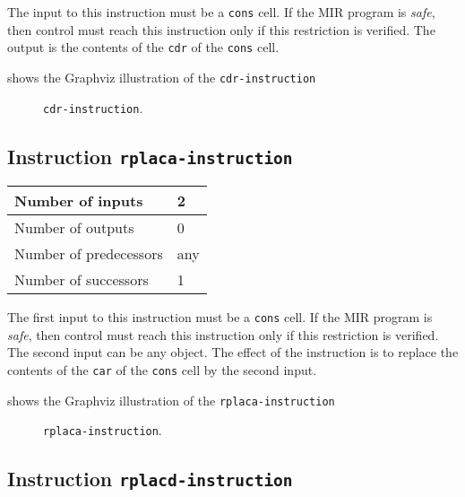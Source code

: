 The input to this instruction must be a \texttt{cons} cell.  If the
MIR program is \emph{safe}, then control must reach this instruction
only if this restriction is verified.  The output is the contents of
the \texttt{cdr} of the \texttt{cons} cell.

 shows the Graphviz illustration of the
\texttt{cdr-instruction}

\begin{figure}
\begin{center}
\end{center}
\caption{\label{fig-cdr-instruction}
\texttt{cdr-instruction}.}
\end{figure}

\subsection{Instruction \texttt{rplaca-instruction}}
\label{mir-instruction-rplaca}

\begin{tabular}{|l|l|}
\hline
Number of inputs & 2\\
\hline
Number of outputs & 0\\
\hline
Number of predecessors & any\\
\hline
Number of successors & 1\\
\hline
\end{tabular}

The first input to this instruction must be a \texttt{cons} cell.  If
the MIR program is \emph{safe}, then control must reach this
instruction only if this restriction is verified.  The second input
can be any object.  The effect of the instruction is to replace the
contents of the \texttt{car} of the \texttt{cons} cell by the second
input.

 shows the Graphviz illustration of the
\texttt{rplaca-instruction}

\begin{figure}
\begin{center}
\end{center}
\caption{\label{fig-rplaca-instruction}
\texttt{rplaca-instruction}.}
\end{figure}

\subsection{Instruction \texttt{rplacd-instruction}}
\label{mir-instruction-rplacd}

